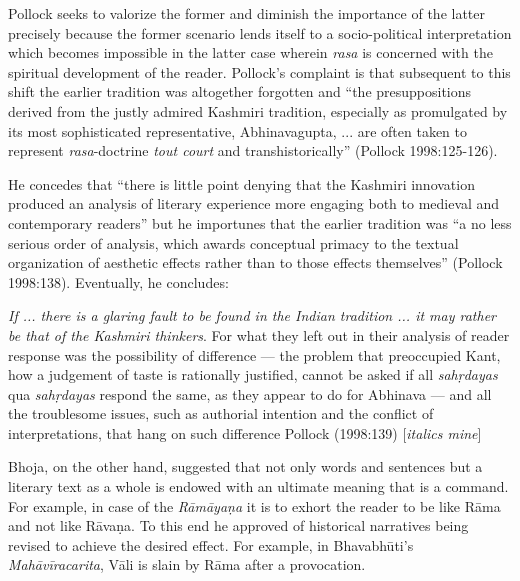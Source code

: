Pollock seeks to valorize the former and diminish the importance of the latter precisely because the former scenario lends itself to a socio-political interpretation which becomes impossible in the latter case wherein \textsl{rasa} is concerned with the spiritual development of the reader. Pollock's complaint is that subsequent to this shift the earlier tradition was altogether forgotten and ``the presuppositions derived from the justly admired Kashmiri tradition, especially as promulgated by its most sophisticated representative, Abhinavagupta, ... are often taken to represent \textsl{rasa}-doctrine \textsl{tout court} and transhistorically'' (Pollock 1998:125-126). 


He concedes that ``there is little point denying that the Kashmiri innovation produced an analysis of literary experience more engaging both to medieval and contemporary readers'' but he importunes that the earlier tradition was ``a no less serious order of analysis, which awards conceptual primacy to the textual organization of aesthetic effects rather than to those effects themselves'' (Pollock 1998:138). Eventually, he concludes:


\begin{myquote}
{\textsl{If ... there is a glaring fault to be found in the Indian tradition ... it may rather be that of the Kashmiri thinkers}}. For what they left out in their analysis of reader response was the possibility of difference --- the problem that preoccupied Kant, how a judgement of taste is rationally justified, cannot be asked if all \textsl{sahṛdayas} qua \textsl{sahṛdayas} respond the same, as they appear to do for Abhinava --- and all the troublesome issues, such as authorial intention and the conflict of interpretations, that hang on such difference 
\hfill Pollock (1998:139) [\textsl{italics mine}]
\end{myquote}


Bhoja, on the other hand, suggested that not only words and sentences but a literary text as a whole is endowed with an ultimate meaning that is a command. For example, in case of the \textsl{Rāmāyaṇa} it is to exhort the reader to be like Rāma and not like Rāvaṇa. To this end he approved of historical narratives being revised to achieve the desired effect. For example, in Bhavabhūti's \textsl{Mahāvīracarita}, Vāli is slain by Rāma after a provocation. 


